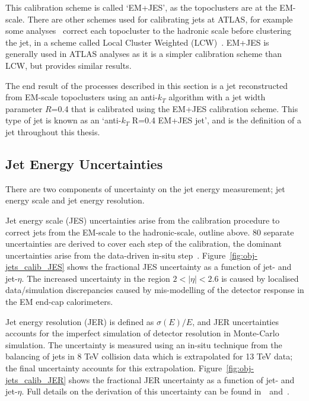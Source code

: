 This calibration scheme is called `EM+JES', as the topoclusters are at the EM-scale.
There are other schemes used for calibrating jets at ATLAS,
for example some analyses~\cite{obj-VVjj} correct each topocluster to the hadronic scale
before clustering the jet, in a scheme called Local Cluster Weighted (LCW)~\cite{obj-jets_topo}.
EM+JES is generally used in ATLAS analyses as it is a simpler calibration scheme than LCW, but provides similar results.

The end result of the processes described in this section is a jet
reconstructed from EM-scale topoclusters using an anti-$k_T$ algorithm with a jet width parameter $R$=0.4
that is calibrated using the EM+JES calibration scheme.
This type of jet is known as an `anti-$k_T$ R=0.4 EM+JES jet',
and is the definition of a jet throughout this thesis.

\newpage

\subsection{Jet Energy Uncertainties}
\label{sec:obj-jets_uncert}

There are two components of uncertainty on the jet energy measurement; jet energy scale and jet energy resolution.

Jet energy scale (JES) uncertainties arise from the calibration procedure
to correct jets from the EM-scale to the hadronic-scale, outline above.
80 separate uncertainties are derived to cover each step of the calibration,
the dominant uncertainties arise from the data-driven in-situ step~\cite{obj-jets_calib_run2}.
Figure~\ref{fig:obj-jets_calib_JES} shows the fractional JES uncertainty as a function of jet-\pT{} and jet-$\eta$.
The increased uncertainty in the region $2 < |\eta| < 2.6$ is caused by localised data/simulation discrepancies
caused by mis-modelling of the detector response in the EM end-cap calorimeters.



Jet energy resolution (JER) is defined as $\sigma(E)/E$, and JER uncertainties
accounts for the imperfect simulation of detector resolution in Monte-Carlo simulation.
The uncertainty is measured using an in-situ technique from the balancing of jets in 8 TeV collision data
which is extrapolated for 13 TeV data; the final uncertainty accounts for this extrapolation.
Figure~\ref{fig:obj-jets_calib_JER} shows the fractional JER uncertainty as a function of jet-\pT{} and jet-$\eta$.
Full details on the derivation of this uncertainty can be found in~\cite{obj-jets_calib_2015}~and~\cite{obj-jets_calib_JER_8TeV}.

